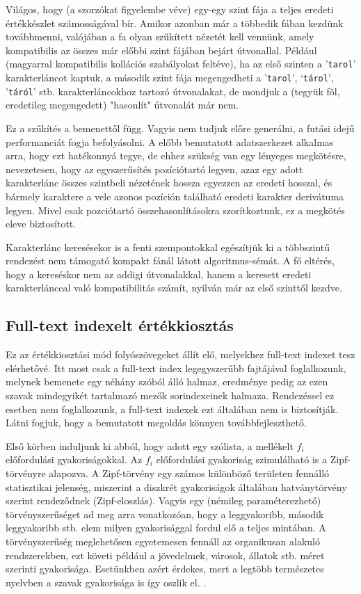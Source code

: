 \documentclass[
    parspace,
    noindent,
    nohyp,
]{elteiktdk}[2023/04/10]
\begin{document}
Világos, hogy (a szorzókat figyelembe véve) egy-egy szint fája
a teljes eredeti értékkészlet számosságával bír.
Amikor azonban már a többedik fában kezdünk továbbmenni,
valójában a fa olyan szűkített nézetét kell vennünk,
amely kompatibilis az összes már előbbi szint fájában bejárt útvonallal.
Például (magyarral kompatibilis kollációs szabályokat feltéve),
ha az első szinten a '\texttt{tarol}' karakterláncot kaptuk,
a második szint fája megengedheti a '\texttt{tarol}', `\texttt{tárol}', '\texttt{táról}' stb.
karakterláncokhoz tartozó útvonalakat,
de mondjuk a (tegyük föl, eredetileg megengedett) "hasonlít" útvonalát már nem.

Ez a szűkítés a bemenettől függ.
Vagyis nem tudjuk előre generálni, a futási idejű performanciát fogja befolyásolni.
A előbb bemutatott adatszerkezet alkalmas arra, hogy ezt hatékonnyá tegye,
de ehhez szükség van egy lényeges megkötésre,
nevezetesen, hogy az egyszerűsítés pozíciótartó legyen,
azaz egy adott karakterlánc összes szintbeli nézetének hossza egyezzen az eredeti hosszal,
és bármely karaktere a vele azonos pozíción található eredeti karakter derivátuma legyen.
Mivel csak pozciótartó összehasonlításokra szorítkoztunk,
ez a megkötés eleve biztosított.

Karakterlánc keresésekor is a fenti szempontokkal egészítjük ki
a többszintű rendezést nem támogató kompakt fánál látott algoritmus-sémát.
A fő eltérés, hogy a kereséskor nem az addigi útvonalakkal,
hanem a keresett eredeti karakterlánccal való kompatibilitás számít,
nyilván már az első szinttől kezdve.

\subsection{Full-text indexelt értékkiosztás}

Ez az értékkiosztási mód folyószövegeket állít elő, melyekhez full-text indexet tesz elérhetővé.
Itt most csak a full-text index legegyszerűbb fajtájával foglalkozunk,
melynek bemenete egy néhány szóból álló halmaz,
eredménye pedig az ezen szavak mindegyikét tartalmazó mezők sorindexeinek halmaza.
Rendezéssel ez esetben nem foglalkozunk, a full-text indexek ezt általában nem is biztosítják.
Látni fogjuk, hogy a bemutatott megoldás könnyen továbbfejleszthető.

Első körben induljunk ki abból, hogy adott egy szólista, a mellékelt $f_i$ előfordulási gyakoriságokkal.
Az $f_i$ előfordulási gyakoriság szimulálható is a Zipf-törvényre alapozva.
A Zipf-törvény egy számos különböző területen fennálló statisztikai jelenség,
miszerint a diszkrét gyakoriságok általában hatványtörvény szerint rendeződnek (Zipf-eloszlás).
Vagyis egy (némileg paraméterezhető) törvényszerűséget ad meg arra vonatkozóan,
hogy a leggyakoribb, második leggyakoribb stb. elem
milyen gyakorisággal fordul elő a teljes mintában.
A törvényszerűség meglehetősen egyetemesen fennáll az organikusan alakuló rendszerekben,
ezt követi például a jövedelmek, városok, állatok stb. méret szerinti gyakorisága.
Esetünkben azért érdekes, mert a legtöbb természetes nyelvben a szavak gyakorisága is így oszlik el.
\cite{Zipf1942UnityOfNature}.
\end{document}
